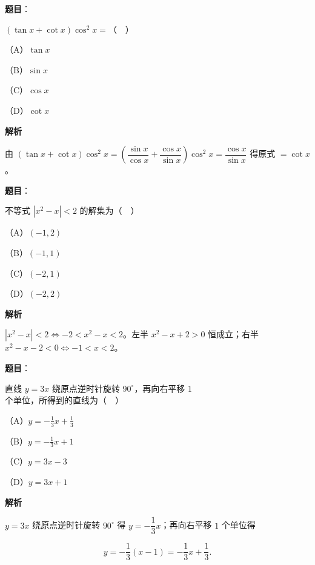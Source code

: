 \begin{answer}

\textbf{题目}：

$(\tan x+\cot x)\cos^2x=$（　）

（A）$\tan x$

（B）$\sin x$

（C）$\cos x$

（D）$\cot x$

\textbf{解析}

由 $(\tan x+\cot x)\cos^2x=\left(\dfrac{\sin x}{\cos x}+\dfrac{\cos x}{\sin x}\right)\cos^2x=\dfrac{\cos x}{\sin x}$ 得原式 $=\cot x$。


\end{answer}
\begin{answer}

\textbf{题目}：

不等式 $|x^2-x|<2$ 的解集为（　）

（A）$(-1,2)$

（B）$(-1,1)$

（C）$(-2,1)$

（D）$(-2,2)$

\textbf{解析}

$|x^2-x|<2\iff-2<x^2-x<2$。左半 $x^2-x+2>0$ 恒成立；右半 $x^2-x-2<0\iff-1<x<2$。


\end{answer}
\begin{answer}

\textbf{题目}：

直线 $y=3x$ 绕原点逆时针旋转 $90^\circ$，再向右平移 $1$ 个单位，所得到的直线为（　）

（A）$y=-\frac13x+\frac13$

（B）$y=-\frac13x+1$

（C）$y=3x-3$

（D）$y=3x+1$

\textbf{解析}

$y=3x$ 绕原点逆时针旋转 $90^\circ$ 得 $y=-\dfrac13x$；再向右平移 $1$ 个单位得

\nopagebreak[4]
\[y=-\frac13(x-1)=-\frac13x+\frac13.\]


\end{answer}
